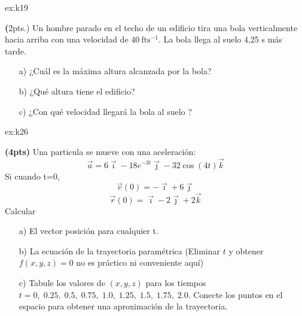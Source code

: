 \begin{multicols}{2}
   
    \begin{excercise}[][][a) $h_{\mathrm{max}}=25\ \mathrm{ft}$, b) $h=119\ \mathrm{ft}$; c)  $v=99\ \mathrm{fts^{-1}}$]{ex:k19}{
        \textbf(2pts.)
         Un hombre parado en el techo de un edificio tira una bola verticalmente hacia arriba con una velocidad de  $40 \ \mathrm{fts^{-1}}$. La bola llega al suelo 4,25 s más tarde. 
            \begin{itemize}
                \item[a)] ¿Cuál es la máxima altura alcanzada por la bola? 
                \item[b)] ¿Qué altura tiene el edificio? 
                \item[c)] ¿Con qué velocidad llegará la bola al suelo ?
            \end{itemize}
         }
    \end{excercise}
    \begin{excercise}[][][a) $\vec{r}=(3t^2-t +1)\vec{\imath}-2 e^{-3t}\vec{\jmath} + 2\cos (4t)\vec{k}$]{ex:k26}{
         \textbf{(4pts)}
       Una particula se mueve con una aceleración:
        \begin{equation*}
            \vec{a}=6\vec{\imath}-18 e^{-3t}\vec{\jmath}-32\cos{(4t)}\vec{k}
            \end{equation*}
            Si cuando t=0, 
        \begin{equation*}
            \vec{v}(0)=-\vec{\imath}+6\vec{\jmath}
        \end{equation*}
        \begin{equation*}
            \vec{r}(0)=\vec{\imath}-2\vec{\jmath}+ 2\vec{k}
        \end{equation*}
        Calcular
        \begin{itemize}
            \item[a)] El vector posición para cualquier t.
            \item[b)] La ecuación de la trayectoria paramétrica (Eliminar $t$ y obtener $f(x,y,z)=0$ no es práctico ni conveniente aquí)
            \item[c)] Tabule los valores de $(x,y,z)$ para los tiempos $t = 0,\; 0.25,\; 0.5,\; 0.75,\; 1.0,\; 1.25,\; 1.5,\; 1.75,\; 2.0.$ Conecte los puntos en el espacio para obtener una aproximación de la trayectoria.
        \end{itemize}
         }
    \end{excercise}


\end{multicols}
